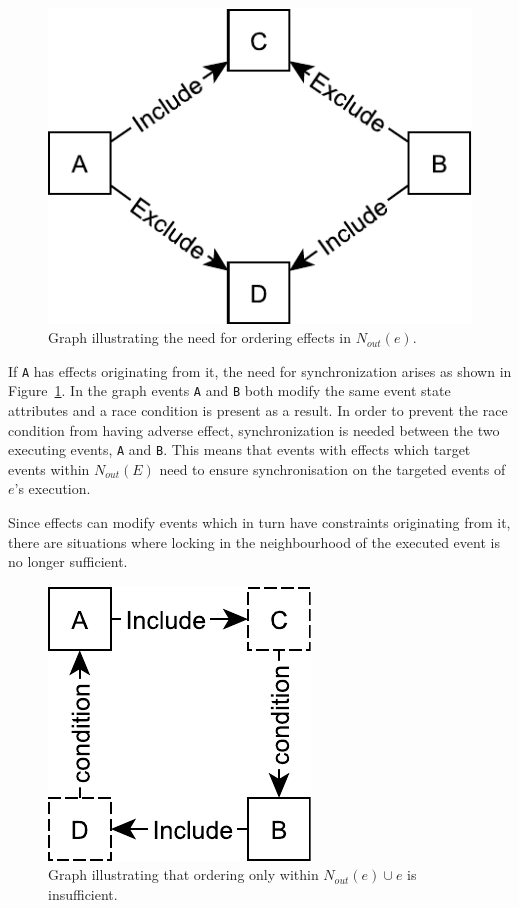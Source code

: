 \documentclass{article}
\begin{document}
	\begin{figure}[ht!]
		\center
		\includegraphics[scale=0.5]{figures/dcr-graphs/race-condition.pdf}
		\caption{Graph illustrating the need for ordering effects in $N_{out}(e)$.}
		\label{fig:race-condition}
	\end{figure}

	If \texttt{A} has effects originating from it, the need for synchronization arises as shown in Figure~\ref{fig:race-condition}.
	In the graph events \texttt{A} and \texttt{B} both modify the same event state attributes and a race condition is present as a result.
	In order to prevent the race condition from having adverse effect, synchronization is needed between the two executing events, \texttt{A} and \texttt{B}.
	This means that events with effects which target events within $N_{out}(E)$ need to ensure synchronisation on the targeted events of $e$'s execution.

	Since effects can modify events which in turn have constraints originating from it, there are situations where locking in the neighbourhood of the executed event is no longer sufficient.

	\begin{figure}[ht!]
		\center
		\includegraphics[scale=0.5]{figures/dcr-graphs/second-degree-effect.pdf}
		\caption{Graph illustrating that ordering only within $N_{out}(e) \cup e$ is insufficient.}
		\label{fig:second-degree-effect}
	\end{figure}
\end{document}

